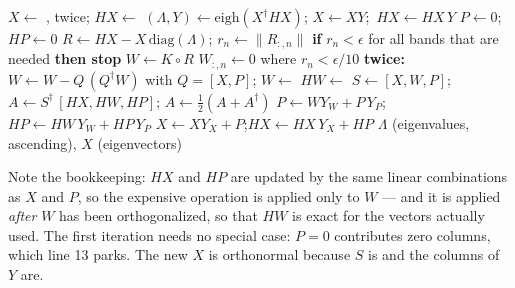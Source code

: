 \begin{algorithm}[tbp]
\caption{LOBPCG for the lowest $N_b$ spinor bands at one $\kk$
(all $\kk$ run batched)}
\label{alg:lobpcg}
\begin{algorithmic}[1]
\State $X \gets$ , twice;\quad
$HX \gets$ 
\State $(\Lambda, Y) \gets \mathrm{eigh}(X^\dagger HX)$;\quad
$X \gets XY$;\ $HX \gets HX\,Y$ 
\State $P \gets 0$;\ $HP \gets 0$ 
\State $R \gets HX - X\,\mathrm{diag}(\Lambda)$;\quad
$r_n \gets \|R_{:,n}\|$ 
\State \textbf{if} $r_n < \epsilon$ for all bands that are needed
\textbf{then stop}
\State $W \gets K \circ R$ 
\State $W_{:,n} \gets 0$ where $r_n < \epsilon/10$
\State \textbf{twice:}\ \ $W \gets W - Q\,(Q^\dagger W)$ with $Q = [X, P]$;\quad
$W \gets$ 
\State $HW \gets$  
\State $S \gets [X, W, P]$;\quad $A \gets S^\dagger\,[HX, HW, HP]$;\quad
$A \gets \tfrac12(A + A^\dagger)$ 
\State $P \gets W Y_W + P\, Y_P$;\quad $HP \gets HW\, Y_W + HP\, Y_P$
\State $X \gets X Y_X + P$;\quad $HX \gets HX\, Y_X + HP$
\EndFor
\State \Return $\Lambda$ (eigenvalues, ascending), $X$ (eigenvectors)
\end{algorithmic}
\end{algorithm}

Note the bookkeeping: $HX$ and $HP$ are updated by the same linear
combinations as $X$ and $P$, so the expensive operation is applied only to
$W$ --- and it is applied \emph{after} $W$ has been orthogonalized, so that
$HW$ is exact for the vectors actually used. The first iteration needs no
special case: $P = 0$ contributes zero columns, which line 13 parks. The
new $X$ is orthonormal because $S$ is and the columns of $Y$ are.

